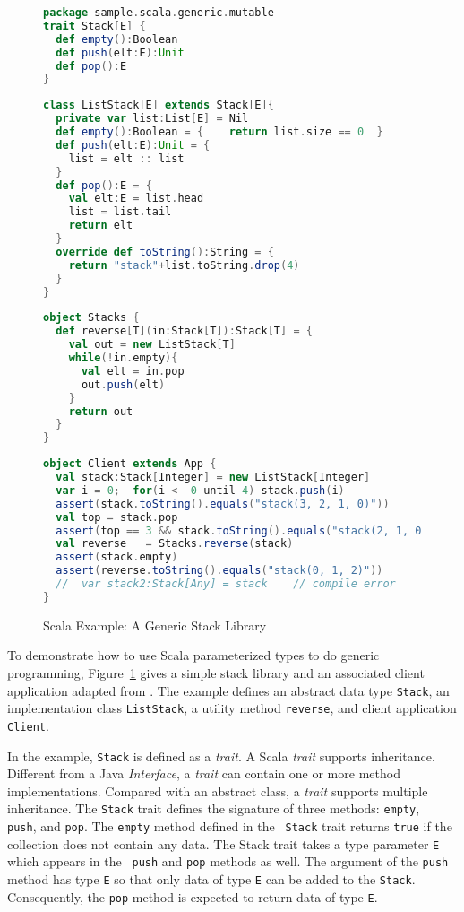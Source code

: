 \begin{figure}[p]
  \begin{lstlisting}[language=scala]
package sample.scala.generic.mutable
trait Stack[E] {
  def empty():Boolean
  def push(elt:E):Unit
  def pop():E
}
  \end{lstlisting}

  \begin{lstlisting}[language=scala]
class ListStack[E] extends Stack[E]{
  private var list:List[E] = Nil
  def empty():Boolean = {    return list.size == 0  }  
  def push(elt:E):Unit = {
    list = elt :: list
  }
  def pop():E = {
    val elt:E = list.head
    list = list.tail
    return elt
  }  
  override def toString():String = {
    return "stack"+list.toString.drop(4)
  }
}
  \end{lstlisting}
  
  \begin{lstlisting}[language=scala]
object Stacks {
  def reverse[T](in:Stack[T]):Stack[T] = {
    val out = new ListStack[T]
    while(!in.empty){
      val elt = in.pop
      out.push(elt)
    }
    return out
  }
}
  \end{lstlisting}

  \begin{lstlisting}[language=scala]
object Client extends App {
  val stack:Stack[Integer] = new ListStack[Integer]
  var i = 0;  for(i <- 0 until 4) stack.push(i)
  assert(stack.toString().equals("stack(3, 2, 1, 0)"))
  val top = stack.pop
  assert(top == 3 && stack.toString().equals("stack(2, 1, 0)"))
  val reverse 	= Stacks.reverse(stack)
  assert(stack.empty)
  assert(reverse.toString().equals("stack(0, 1, 2)"))  
  //  var stack2:Stack[Any] = stack    // compile error
}
  \end{lstlisting}  
    
  \caption{Scala Example: A Generic Stack Library}
  \label{scala_generic_example}
\end{figure}

To demonstrate how to use Scala parameterized types to do generic programming, 
Figure~\ref{scala_generic_example} gives a simple stack library and an 
associated client application adapted from
\citep[Example 5-2]{JGC}. The example defines an abstract data type {\tt Stack}, an 
implementation class {\tt ListStack}, a utility method {\tt reverse}, and 
client application {\tt Client}.

In the example, {\tt Stack} is defined as a {\it trait}.  A Scala {\it trait} supports
inheritance. Different from a
Java {\it Interface}, a {\it trait} can contain one or more method implementations.  
Compared with an abstract class, a {\it trait} supports multiple inheritance.  The 
{\tt Stack} trait defines the signature of three methods: {\tt empty}, {\tt 
push}, and {\tt pop}.  The {\tt empty} method defined in the {\tt 
Stack} trait returns {\tt true} if the collection does not contain any data.  
The {Stack} trait takes a type parameter {\tt E} which appears in the {\tt 
push} and {\tt pop} methods as well.  The argument of the {\tt push} method has type 
{\tt E} so that only data of type {\tt E} can be added to the {\tt Stack}.  
Consequently, the {\tt pop} method is expected to return data of type {\tt E}.

